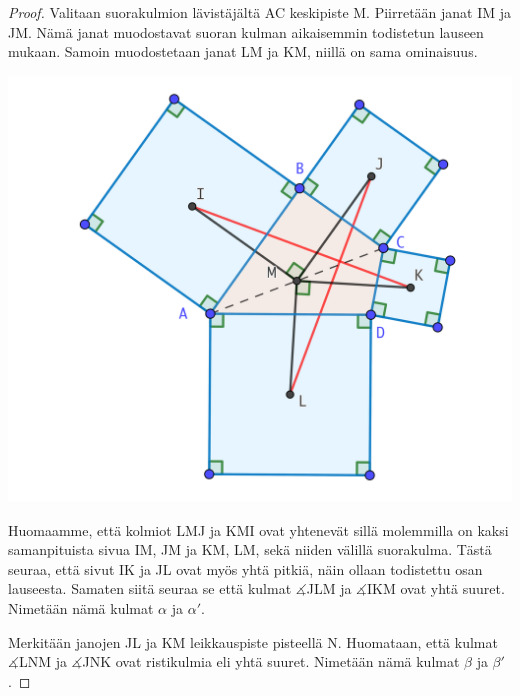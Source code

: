 \documentclass{scrartcl}
\begin{document}
\medskip
\begin{proof}
Valitaan suorakulmion lävistäjältä AC keskipiste M. Piirretään janat IM ja JM. Nämä janat muodostavat suoran kulman aikaisemmin todistetun lauseen mukaan. Samoin muodostetaan janat LM ja KM, niillä on sama ominaisuus.
\begin{center}
    \includegraphics[scale=0.3]{todistus1}
\end{center}
Huomaamme, että kolmiot LMJ ja KMI ovat yhtenevät sillä molemmilla on kaksi samanpituista sivua IM, JM ja KM, LM, sekä niiden välillä suorakulma. Tästä seuraa, että sivut IK ja JL ovat myös yhtä pitkiä, näin ollaan todistettu osan lauseesta. Samaten siitä seuraa se että kulmat $\measuredangle$JLM ja $\measuredangle$IKM ovat yhtä suuret. Nimetään nämä kulmat $\alpha$ ja $\alpha'$.

Merkitään janojen JL ja KM leikkauspiste pisteellä N. Huomataan, että kulmat $\measuredangle$LNM ja $\measuredangle$JNK ovat ristikulmia eli yhtä suuret. Nimetään nämä kulmat $\beta$ ja $\beta'$.


\end{proof}
\end{document}
